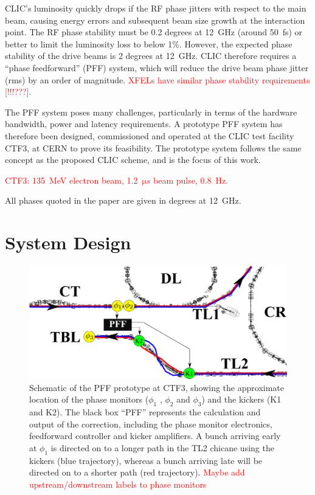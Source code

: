 \documentclass[%
 reprint,
 amsmath,amssymb,
 prl,
]{revtex4-1}
\begin{document}
CLIC's luminosity quickly drops if the RF phase jitters with respect to the 
main beam, causing energy errors and subsequent beam size growth at the 
interaction point. The RF phase 
stability must be 0.2 degrees at 12~GHz (around 50~fs) or better to limit the luminosity loss 
to below 1\%.  However, the expected phase stability of the drive beams is 2 
degrees at 12~GHz. CLIC therefore requires a ``phase feedforward'' (PFF) 
system, which will reduce the drive beam phase jitter (rms) by an order of 
magnitude. \textcolor{red}{XFELs have similar phase stability requirements [!!!???].}

The PFF system poses many challenges, particularly in terms of the hardware 
bandwidth, power and latency requirements. A prototype PFF system has therefore 
been designed, commissioned and operated at the CLIC 
test facility CTF3, at CERN to prove its feasibility. The prototype system 
follows the same concept as the proposed CLIC scheme, and is the focus of this 
work. 

\textcolor{red}{CTF3: 135~MeV electron beam, 1.2~\(\mathrm{\mu}s\) beam pulse, 0.8~Hz.}

All phases quoted in the paper are given in degrees at 12~GHz.

\section{\label{s:ctfLayout}System Design}

\begin{figure}
	\includegraphics[width=\textwidth]{figs/ctfpffLayout}%
	\caption{\label{fig:pffLayout}Schematic of the PFF prototype at CTF3, 
	showing the approximate location of the phase monitors (\(\phi_1\) , 
	\(\phi_2\) and \(\phi_3\)) and
		the kickers (K1 and K2). The black box “PFF” represents the calculation 
		and output of the correction, including the phase monitor
		electronics, feedforward controller and kicker amplifiers. A bunch 
		arriving early at \(\phi_1\) is directed on to a longer path in the TL2 
		chicane
		using the kickers (blue trajectory), whereas a bunch arriving late will 
		be directed on to a shorter path (red trajectory). 
		\textcolor{red}{Maybe add upstream/downstream labels to phase monitors}}
\end{figure}
\end{document}
